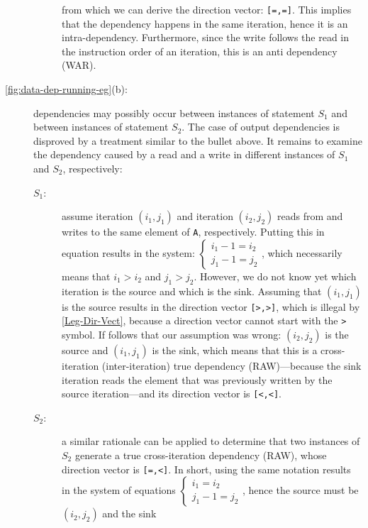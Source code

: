 \documentclass[acmsmall,review]{acmart}\settopmatter{printfolios=true,printccs=false,printacmref=false}
\begin{document}
\begin{description}
\begin{description}
        from which we can derive the direction vector:
        {\tt[=,=]}. This implies that the dependency happens
        in the same iteration, hence it is an intra-dependency.
        Furthermore, since the write follows the read in the
        instruction order of an iteration, this is an anti 
        dependency (WAR).
    \end{description}
    \item[\cref{fig:data-dep-running-eg}(b):] dependencies
        may possibly occur between instances of statement $S_1$
        and between instances of statement $S_2$. The case of
        output dependencies is disproved by a treatment similar
        to the bullet above. It remains to examine the dependency
        caused by a read and a write in different instances of
        $S_1$ and $S_2$, respectively:
    \begin{description}
        \item[$S_1$:] assume iteration $(i_1,j_1)$ and iteration
        $(i_2,j_2)$ reads from and writes to the same element of 
        {\tt A}, respectively. Putting this in equation results in
        the system: $\begin{cases}i_1-1 = i_2\\j_1-1 = j_2\end{cases}$,
        which necessarily means that $i_1 > i_2$ and $j_1 > j_2$.
        However, we do not know yet which iteration is the source
        and which is the sink. Assuming that $(i_1, j_1)$ is the
        source results in the direction vector {\tt[>,>]}, which is
        illegal by \cref{Leg-Dir-Vect}, because a direction
        vector cannot start with the {\tt>} symbol. If follows
        that our assumption was wrong: $(i_2, j_2)$ is the source
        and $(i_1, j_1)$ is the sink, which means that this is
        a cross-iteration (inter-iteration) true dependency
        (RAW)---because the sink iteration reads the element 
        that was previously written by the source iteration---and
        its direction vector is {\tt[<,<]}.
        \item[$S_2$:] a similar rationale can be applied to
        determine that two instances of $S_2$ generate
        a true cross-iteration dependency (RAW), whose
        direction vector is {\tt[=,<]}. In short, using the
        same notation results in the system of equations  
        $\begin{cases}i_1 = i_2\\j_1-1 = j_2\end{cases}$,
        hence the source must be $(i_2,j_2)$ and the sink

\end{description}
\end{description}
\end{document}
